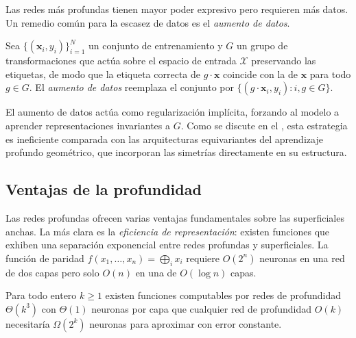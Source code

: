 Las redes m\'as profundas tienen mayor poder expresivo pero requieren m\'as datos.
Un remedio com\'un para la escasez de datos es el \emph{aumento de datos}.

\begin{definition}
\label{def:found:augmentation}
Sea $\{(\mathbf{x}_i, y_i)\}_{i=1}^N$ un conjunto de entrenamiento y $G$ un grupo
de transformaciones que act\'ua sobre el espacio de entrada $\mathcal{X}$
preservando las etiquetas, de modo que la etiqueta correcta de $g \cdot \mathbf{x}$
coincide con la de $\mathbf{x}$ para todo $g \in G$. El \emph{aumento de datos}
reemplaza el conjunto por $\{(g \cdot \mathbf{x}_i, y_i) : i, g \in G\}$.
\end{definition}

El aumento de datos act\'ua como regularizaci\'on impl\'icita, forzando al modelo a
aprender representaciones invariantes a $G$. Como se discute en el ,
esta estrategia es ineficiente comparada con las arquitecturas equivariantes del
aprendizaje profundo geom\'etrico, que incorporan las simetr\'ias directamente en su
estructura.

\subsection{Ventajas de la profundidad}
\label{sec:found:depth}

Las redes profundas ofrecen varias ventajas fundamentales sobre las superficiales
anchas. La m\'as clara es la \emph{eficiencia de representaci\'on}: existen
funciones que exhiben una separaci\'on exponencial entre redes profundas y
superficiales. La funci\'on de paridad $f(x_1, \ldots, x_n) = \bigoplus_i x_i$
requiere $O(2^n)$ neuronas en una red de dos capas pero solo $O(n)$ en una de
$O(\log n)$ capas.

\begin{theorem}
\label{thm:found:telgarsky}
Para todo entero $k \ge 1$ existen funciones computables por redes de profundidad
$\Theta(k^3)$ con $\Theta(1)$ neuronas por capa que cualquier red de profundidad
$O(k)$ necesitar\'ia $\Omega(2^k)$ neuronas para aproximar con error constante.
\end{theorem}

